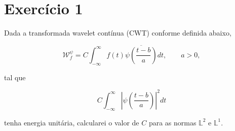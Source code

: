
\section*{\large Exercício 1}
%




Dada a transformada wavelet contínua (CWT) conforme definida abaixo,

\begin{equation*}
\mathcal{W}_{f}^{\psi} = C\int_{-\infty}^{\infty}f(t)\overline{\psi \left(\frac{t-b}{a} \right)}dt, \qquad a>0,
\end{equation*}

tal que

\begin{equation*}
C\int_{-\infty}^{\infty}\left| \psi \left( \frac{t-b}{a} \right) \right| ^{2} dt
\end{equation*}

tenha energia unitária, calcularei o valor de $C$ para as normas $\mathbb{L}^2$ e $\mathbb{L}^1$.

